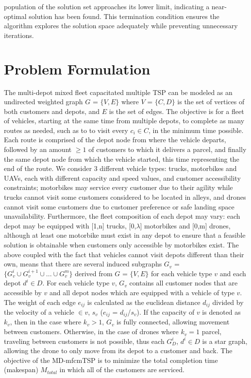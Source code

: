\documentclass{article}
\begin{document}
population of the solution set approaches its lower limit, indicating a near-optimal solution has been found. This termination condition ensures the algorithm explores the solution space adequately while preventing unnecessary iterations. 
	\par 
	\;
	\section{Problem Formulation}
	The multi-depot mixed fleet capacitated multiple TSP can be modeled as an undirected weighted graph $G$ = $\{V,E\}$ where $V$ = $\{C,D\}$ is the set of vertices of both customers and depots, and $E$ is the set of edges. The objective is for a fleet of vehicles, starting at the same time from multiple depots, to complete as many routes as needed, such as to to visit every $c_i\in C$, in the minimum time possible. Each route is comprised of the depot node from where the vehicle departs, followed by an amount $\geq 1$ of customers to which it delivers a parcel, and finally the same depot node from which the vehicle started, this time representing the end of the route. We consider 3 different vehicle types: trucks, motorbikes and UAVs, each with different capacity and speed values, and customer accessibility constraints; motorbikes may service every customer due to their agility while trucks cannot visit some customers considered to be located in alleys, and drones cannot visit some customers due to customer preference or safe landing space unavailability. Furthermore, the fleet composition of each depot may vary: each depot may be equipped with [1,n] trucks, [0,$\lambda$] motorbikes and [0,m] drones, although at least one motorbike must exist in any depot to ensure that a feasible solution is obtainable when customers only accessible by motorbikes exist. The above coupled with the fact that vehicles cannot visit depots different than their own, means that there are several induced subgraphs  $G_v$ = $\{G_v^i\cup G_v^{i+1}\cup ...\cup G_v^{m}\}$ derived from $G$ = $\{V,E\}$ for each vehicle type $v$ and each depot $d^i\in D$. For each vehicle type $v$, $G_v$ contains all customer nodes that are accessible by $v$ and all depot nodes which are equipped with a vehicle of type $v$. The weight of each edge $e_{ij}$ is calculated as the euclidean distance $d_{ij}$ divided by the velocity of a vehicle $\in v$, $s_v$ ($e_{ij}$ = $d_{ij}$/$s_v$). If the capacity of $v$ is denoted as $k_v$, then in the case where $k_v > 1$, $G_v$ is fully connected, allowing movement between customers. Otherwise, in the case of drones where $k_v=1$ parcel, traveling between customers is not possible, thus each $G_D^i$, $d^i\in D$ is a star graph, allowing the drone to only move from its depot to a customer and back. The objective of the MD-mfcmTSP is to minimize the total completion time (makespan) $M_{total}$ in which all of the customers are serviced.
\end{document}
